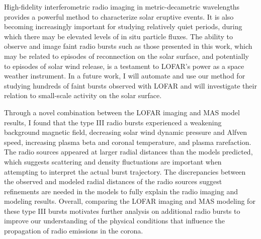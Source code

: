 High-fidelity interferometric radio imaging in metric-decametric wavelengths provides a powerful method to characterize solar eruptive events. It is also becoming increasingly important for studying relatively quiet periods, during which there may be elevated levels of in situ particle fluxes. The ability to observe and image faint radio bursts such as those presented in this work, which may be related to episodes of reconnection on the solar surface, and potentially to episodes of solar wind release, is a testament to LOFAR’s power as a space weather instrument. In a future work, I will automate and use our method for studying hundreds of faint bursts observed with LOFAR and will investigate their relation to small-scale activity on the solar surface.

Through a novel combination between the LOFAR imaging and MAS model results, I found that the type III radio bursts experienced a weakening background magnetic field, decreasing solar wind dynamic pressure and Alfven speed, increasing plasma beta and coronal temperature, and plasma rarefaction.
The radio sources appeared at larger radial distances than the models predicted, which suggests scattering and density fluctuations are important when attempting to interpret the actual burst trajectory.
The discrepancies between the observed and modeled radial distances of the radio sources suggest refinements are needed in the models to fully explain the radio imaging and modeling results. Overall, comparing the LOFAR imaging and MAS modeling for these type III bursts motivates further analysis on additional radio bursts to improve our understanding of the physical conditions that influence the propagation of radio emissions in the corona.

